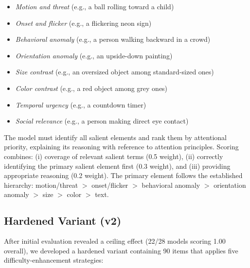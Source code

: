 \documentclass{article}
\begin{document}
\begin{itemize}
    \item \emph{Motion and threat} (e.g., a ball rolling toward a child)
    \item \emph{Onset and flicker} (e.g., a flickering neon sign)
    \item \emph{Behavioral anomaly} (e.g., a person walking backward in a crowd)
    \item \emph{Orientation anomaly} (e.g., an upside-down painting)
    \item \emph{Size contrast} (e.g., an oversized object among standard-sized ones)
    \item \emph{Color contrast} (e.g., a red object among grey ones)
    \item \emph{Temporal urgency} (e.g., a countdown timer)
    \item \emph{Social relevance} (e.g., a person making direct eye contact)
\end{itemize}

The model must identify all salient elements and rank them by attentional priority, explaining its reasoning with reference to attention principles. Scoring combines: (i) coverage of relevant salient terms (0.5 weight), (ii) correctly identifying the primary salient element first (0.3 weight), and (iii) providing appropriate reasoning (0.2 weight). The primary element follows the established hierarchy: motion/threat $>$ onset/flicker $>$ behavioral anomaly $>$ orientation anomaly $>$ size $>$ color $>$ text.

\subsection{Hardened Variant (v2)}

After initial evaluation revealed a ceiling effect (22/28 models scoring 1.00 overall), we developed a hardened variant containing 90 items that applies five difficulty-enhancement strategies:
\end{document}
